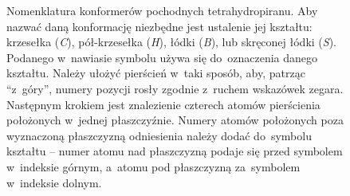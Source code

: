 \begin{figure}
  
  \caption{
    Nomenklatura konformerów pochodnych tetrahydropiranu.
    Aby nazwać daną konformację niezbędne jest ustalenie jej kształtu:
      krzesełka (\textit{C}), pół-krzesełka (\textit{H}), łódki (\textit{B}),
      lub skręconej łódki (\textit{S}).
    Podanego w~nawiasie symbolu używa się do~oznaczenia danego kształtu.
    Należy ułożyć pierścień w~taki sposób, aby, patrząc \enquote{z~góry},
      numery pozycji rosły zgodnie z~ruchem wskazówek zegara.
    Następnym krokiem jest znalezienie czterech atomów pierścienia położonych
      w~jednej płaszczyźnie.
    Numery atomów położonych poza wyznaczoną płaszczyzną odniesienia należy dodać
      do~symbolu kształtu \--- numer atomu nad płaszczyzną podaje się przed symbolem w~indeksie
      górnym, a~atomu pod płaszczyzną za~symbolem w~indeksie dolnym.
  }\label{fig:thp-conformers}
\end{figure}


